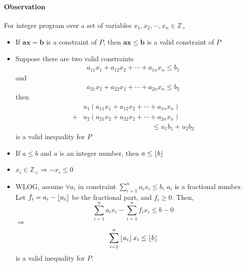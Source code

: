             \paragraph{Observation}
                For integer program over a set of variables $x_1, x_2, \cdots, x_n \in \mathbb{Z}_+$
                \begin{itemize}
                    \item If $\mathbf{ax} = \mathbf{b}$ is a constraint of $P$, then $\mathbf{ax \le b}$ is a valid constraint of $P$
                    \item Suppose there are two valid constraints
                        \begin{align*}
                            a_{11} x_1 + a_{12} x_2 + \cdots + a_{1n} x_n \le b_1
                        \end{align*}
                        and
                        \begin{align*}
                            a_{21} x_2 + a_{22} x_2 + \cdots + a_{2n} x_n \le b_2
                        \end{align*}
                        then
                        \begin{align*}
                            & u_1 (a_{11} x_1 + a_{12} x_2 + \cdots + a_{1n} x_n)\\
                          + & u_2 (a_{21} x_2 + a_{22} x_2 + \cdots + a_{2n} x_n) \\
                            & \qquad \qquad \qquad \qquad \qquad \le u_1 b_1 + u_2 b_2
                        \end{align*}
                        is a valid inequality for $P$
                    \item If $a \le b$ and $a$ is an integer number, then $a \le \left\lfloor b \right\rfloor$
                    \item $x_i \in \mathbb{Z}_+ \Rightarrow -x_i \le 0$
                    \item WLOG, assume $\forall a_i$ in constraint $\sum_{i=1}^n a_i x_i \le b$, $a_i$ is a fractional number. Let $f_i = a_i - \left\lfloor a_i \right\rfloor$ be the fractional part, and $f_i \ge 0$. Then,
                    \begin{equation*}
                        \sum_{i=1}^n a_i x_i - \sum_{i=1}^n f_i x_i \le b - 0
                    \end{equation*}
                    $\Rightarrow$
                    \begin{equation*}
                        \sum_{i=1}^n \left\lfloor a_i \right\rfloor x_i \le \left\lfloor b \right\rfloor
                    \end{equation*} is a valid inequality for $P$.
                \end{itemize}
                
